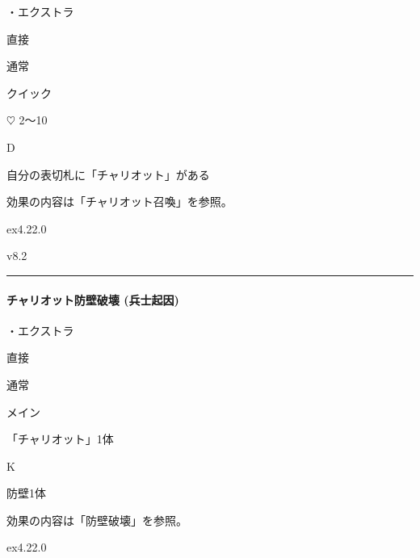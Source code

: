 \documentclass[letterpaper,10pt,dvipdfmx]{sphinxmanual}
\begin{document}
\sphinxAtStartPar
・エクストラ

\sphinxAtStartPar
{} 直接

\sphinxAtStartPar
{} 通常

\sphinxAtStartPar
{} クイック

\sphinxAtStartPar
{} {\normalsize $\heartsuit$} 2〜10

\sphinxAtStartPar
{} D

\sphinxAtStartPar
{}

\sphinxAtStartPar
自分の表切札に「チャリオット」がある

\sphinxAtStartPar
{}

\sphinxAtStartPar
効果の内容は「チャリオット召喚」を参照。

\sphinxAtStartPar
{}  ex4.22.0

\sphinxAtStartPar
{}  v8.2


\bigskip\hrule\bigskip



\paragraph{チャリオット防壁破壊 (兵士起因)}
\label{\detokenize{auto/frameActionlist:act-chariotdestroy}}\label{\detokenize{auto/frameActionlist:id49}}
\sphinxAtStartPar
{}

\sphinxAtStartPar
・エクストラ

\sphinxAtStartPar
{} 直接

\sphinxAtStartPar
{} 通常

\sphinxAtStartPar
{} メイン

\sphinxAtStartPar
{} 「チャリオット」1体

\sphinxAtStartPar
{} K

\sphinxAtStartPar
{}

\sphinxAtStartPar
防壁1体

\sphinxAtStartPar
{}

\sphinxAtStartPar
効果の内容は「防壁破壊」を参照。

\sphinxAtStartPar
{}  ex4.22.0
\end{document}
